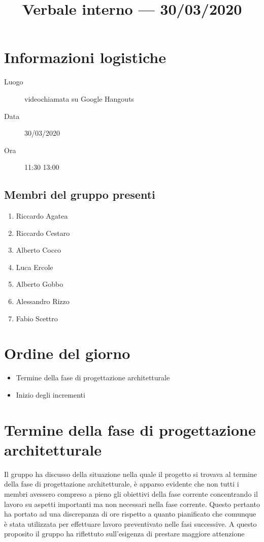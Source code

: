 \documentclass{article}
\title{Verbale interno --- 30/03/2020}
\begin{document}


\section{Informazioni logistiche}%
\label{sec:informazioni_logistiche}

\begin{description}
  \item [Luogo] videochiamata su Google Hangouts
  \item [Data] 30/03/2020
  \item [Ora] 11:30  13:00
\end{description}

\subsection{Membri del gruppo presenti}%
\label{sub:membri_del_gruppo_presenti}

\begin{enumerate}
  \item Riccardo Agatea
  \item Riccardo Cestaro
  \item Alberto Cocco
  \item Luca Ercole
  \item Alberto Gobbo
  \item Alessandro Rizzo
  \item Fabio Scettro
\end{enumerate}

\section{Ordine del giorno}%
\label{sec:ordine_del_giorno}

\begin{itemize}
  \item Termine della fase di progettazione architetturale
  \item Inizio degli incrementi
\end{itemize}

\section{Termine della fase di progettazione architetturale}%
\label{sec:termine_progettazione}
Il gruppo ha discusso della situazione nella quale il progetto si trovava al termine della fase di progettazione architetturale, è apparso evidente che non tutti i membri avessero compreso a pieno gli obiettivi della fase corrente concentrando il lavoro su aspetti importanti ma non necessari nella fase corrente.
Questo pertanto ha portato ad una discrepanza di ore rispetto a quanto pianificato che comunque è stata utilizzata per effettuare lavoro preventivato nelle fasi successive.
A questo proposito il gruppo ha riflettuto sull'esigenza di prestare maggiore attenzione
\end{document}
